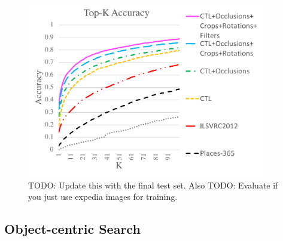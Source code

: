 \documentclass[letterpaper]{article} %
\begin{document}
\begin{figure}
    \centering
    \includegraphics[height=3in]{figures/data_augmentation/accuracy_at_k.png}
    \caption[Accuracy at K for whole image search.]{TODO: Update this with the final test set. Also TODO: Evaluate if you just use expedia images for training.}
    \label{fig:accuracyAtK}
\end{figure}


\subsection{Object-centric Search}
\end{document}
